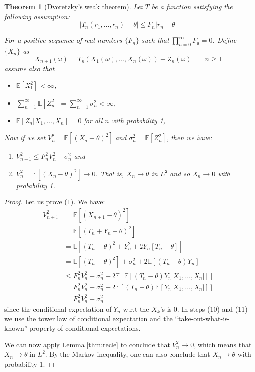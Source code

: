 \documentclass{article}
\def\E{\mathbb{E}}
\newtheorem{theorem}{Theorem}
\begin{document}
\begin{theorem}[Dvoretzky's weak theorem]
Let $T$ be a function satisfying the following assumption:
\begin{equation}\label{eq:dvoret}
|T_n(r_1,\dots,r_n) - \theta| \le F_n | r_n - \theta |    
\end{equation}

For a positive sequence of real numbers $\{F_n\}$ such that $\prod_{n=0}^\infty F_n =0$.
Define $\{X_n\}$ as
\[
X_{n+1}(\omega) = T_n(X_1(\omega),\dots,X_n(\omega)) + Z_n(\omega) \qquad n \ge 1 
\]
assume also that
\begin{itemize}
    \item $\mathbb{E}[X_1^2] < \infty$,
    \item $\sum_{n=1}^{\infty}\E[Z_n^2] = \sum_{n=1}^{\infty}\sigma_n^2 < \infty$,
    \item $\E[Z_n | X_1,\dots,X_n] = 0$ for all $n$ with probability 1,
\end{itemize}

Now if we set $V_n^2 = \E\left[ (X_n - \theta)^2\right]$ and $\sigma_n^2 = \E\left[ Z_n^2 \right]$, then we have:
\begin{enumerate}
    \item $V_{n+1}^2 \le F_n^2 V_n^2 + \sigma_n^2$ and
    \item $V_n^2 = \E\left[ (X_n - \theta)^2\right] \to 0$. That is, $X_n \to \theta$ in $L^2$ and so $X_n \to 0$ with probability 1. 
\end{enumerate} 

\end{theorem}
\begin{proof}
    Let us prove (1). We have:
    \begin{align}
    V_{n+1}^2 &= \E\left[(X_{n+1} - \theta)^2\right] \\
              &= \E\left[ (T_n + Y_n - \theta)^2 \right] \\
              &= \E\left[ (T_n - \theta)^2 + Y_n^2 + 2Y_n\left[T_n - \theta\right] \right] \\
              &= \E\left[(T_n - \theta)^2\right] + \sigma_n^2 + 2 \E[(T_n - \theta)Y_n] \\
              &\le F_n^2 V_n^2 + \sigma_n^2 + 2\E\left[\E\left[(T_n - \theta)Y_n | X_1,\dots,X_n]\right]\right] \\
              &=  F_n^2 V_n^2 + \sigma_n^2 + 2\E\left[(T_n - \theta)\E\left[Y_n | X_1,\dots,X_n]\right]\right] \\
              &= F_n^2 V_n^2 + \sigma_n^2
    \end{align}
    since the conditional expectation of $Y_n$ w.r.t the $X_k$'s is 0. In steps (10) and (11) we use the tower law of conditional expectation and the ``take-out-what-is-known'' property of conditional expectations.
    
    We can now apply Lemma \ref{thm:recle} to conclude that $V_n^2 \rightarrow 0$, which means that $X_n \rightarrow \theta$ in $L^2$. By the Markov inequality, one can also conclude that $X_n \rightarrow \theta$ with probability 1.
\end{proof}
\end{document}
